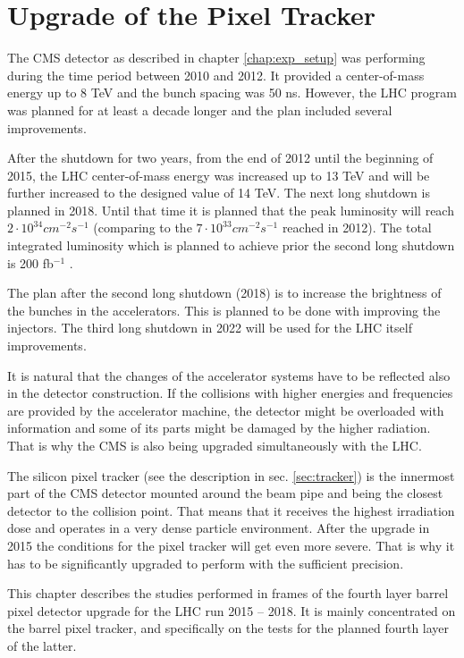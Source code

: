 \chapter{Upgrade of the Pixel Tracker}\label{chapt:pixel}

The CMS detector as described in chapter \ref{chap:exp_setup} was performing during the time period 
between 2010 and 2012. It provided a center-of-mass energy up to 8 TeV and the bunch spacing was 50 ns. 
However, the LHC program was planned for at least a decade longer and the plan included several improvements.

After the shutdown for two years, from the end of 2012 until the beginning of 2015, the LHC 
center-of-mass energy was increased up to 13 TeV and will be further increased to the designed value
of 14 TeV. The next long shutdown is planned in 2018. Until that time it is planned that the peak
luminosity will reach $2 \cdot 10^{34} cm^{-2} s^{-1}$ (comparing to the $7 \cdot 10^{33} cm^{-2}s^{-1}$
reached in 2012). The total integrated luminosity which is planned to achieve prior the second long shutdown
is 200 fb$^{-1}$ \cite{CMS:2012sda}.

The plan after the second long shutdown (2018) is to increase the brightness of the bunches
in the accelerators. This is planned to be done with improving the injectors. The third long shutdown in 2022
will be used for the LHC itself improvements.

It is natural that the changes of the accelerator systems have to be reflected also in the detector construction.
If the collisions with higher energies and frequencies are provided by the accelerator machine, the detector might
be overloaded with information and some of its parts might be damaged by the higher radiation. That is why 
the CMS is also being upgraded simultaneously with the LHC.

The silicon pixel tracker (see the description in sec. \ref{sec:tracker}) is the innermost part of the CMS 
detector mounted around the beam pipe and being the closest detector to the collision point. That means that
it receives the highest irradiation dose and operates in a very dense particle environment. After the upgrade 
in 2015 the conditions for the pixel tracker will get even more severe. That is why it has to be significantly 
upgraded to perform with the sufficient precision. 

This chapter describes the studies performed in frames of the fourth layer barrel pixel detector upgrade for the
LHC run 2015 -- 2018. It is mainly concentrated on the barrel pixel tracker, and specifically on the tests for the
planned fourth layer of the latter.

